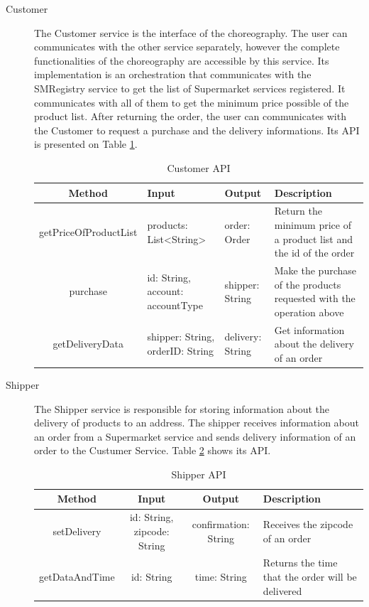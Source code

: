 \begin{description}
\item[Customer] The Customer service is the interface of the choreography. The user can communicates with the other service separately, however the complete functionalities of the choreography are accessible by this service. Its implementation is an orchestration that communicates with the SMRegistry service to get the list of Supermarket services registered. It communicates with all of them to get the minimum price possible of the product list. After returning the order, the user can communicates with the Customer to request a purchase and the delivery informations. Its API is presented on Table \ref{customerapi}.
	\begin{table}[htdp]
	\caption{Customer API}
	\begin{center}
	\begin{tabular}{|c|m{3.5cm}|m{3.5cm}|m{4cm}|}
		\hline
		Method				& Input					& Output 					& Description \\ \hline
		getPriceOfProductList	& products: List<String> & order: Order & Return the minimum price of a product list and the id of the order\\ \hline
		purchase 				& id: String, account: accountType & shipper: String & Make the purchase of the products requested with the operation above \\ \hline
		getDeliveryData 		& shipper: String, orderID: String & delivery: String & Get information about the delivery of an order \\ \hline
		
	\end{tabular}
	\end{center}
	\label{customerapi}
	\end{table}%

\item[Shipper] The Shipper service is responsible for storing information about the delivery of products to an address. The shipper receives information about an order from a Supermarket service and sends delivery information of an order to the Custumer Service. Table \ref{shipperapi} shows its API.

	\begin{table}[htdp]
	\caption{Shipper API}
	\begin{center}
		\begin{tabular}{|c|c|c|m{4cm}|}
		\hline
		Method			& Input					& Output 					& Description \\ \hline
		setDelivery		& id: String, zipcode: String	& confirmation: String		& Receives the zipcode of an order \\ \hline
		getDataAndTime	& id: String				& time: String				& Returns the time that the order will be delivered \\ \hline
	\end{tabular}
	\end{center}
	\label{shipperapi}
	\end{table}%
	\end{description}
	
